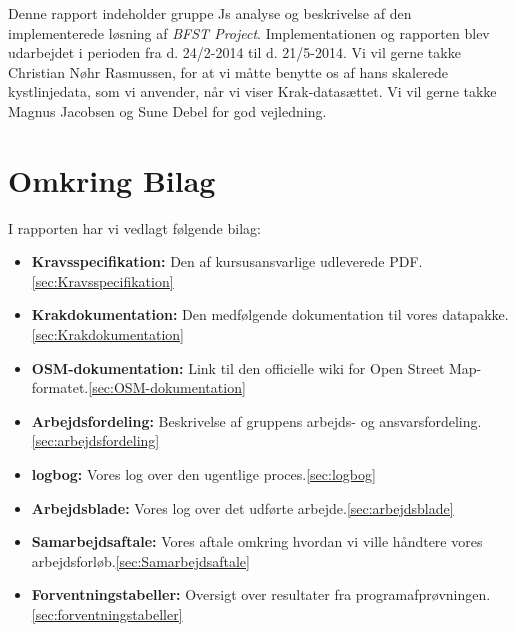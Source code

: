Denne rapport indeholder gruppe Js analyse og beskrivelse af den implementerede løsning af \emph{BFST Project}. Implementationen og rapporten blev udarbejdet i perioden fra d. 24/2-2014 til d. 21/5-2014.
Vi vil gerne takke Christian Nøhr Rasmussen, for at vi måtte benytte os af hans skalerede kystlinjedata, som vi anvender, når vi viser Krak-datasættet. Vi vil gerne takke Magnus Jacobsen og Sune Debel for god vejledning.

\section{Omkring Bilag}
I rapporten har vi vedlagt følgende bilag:
\begin{itemize}
	\item \textbf{Kravsspecifikation:} Den af kursusansvarlige udleverede PDF.\ref{sec:Kravsspecifikation}
	\item \textbf{Krakdokumentation:} Den medfølgende dokumentation til vores datapakke.\ref{sec:Krakdokumentation}
	\item \textbf{OSM-dokumentation:} Link til den officielle wiki for Open Street Map-formatet.\ref{sec:OSM-dokumentation}
	\item \textbf{Arbejdsfordeling:} Beskrivelse af gruppens arbejds- og ansvarsfordeling.\ref{sec:arbejdsfordeling}
	\item \textbf{logbog:} Vores log over den ugentlige proces.\ref{sec:logbog}
	\item \textbf{Arbejdsblade:} Vores log over det udførte arbejde.\ref{sec:arbejdsblade}
	\item \textbf{Samarbejdsaftale:} Vores aftale omkring hvordan vi ville håndtere vores arbejdsforløb.\ref{sec:Samarbejdsaftale}
	\item \textbf{Forventningstabeller:} Oversigt over resultater fra programafprøvningen.\ref{sec:forventningstabeller}
\end{itemize}

